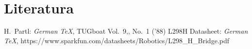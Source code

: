 \section{Literatura}

  \begin{thebibliography}{99}
     H.~Partl: \emph{German \TeX}, TUGboat Vol.~9,, No.~1 ('88)
     L298H Datasheet: \emph{German \TeX}, https://www.sparkfun.com/datasheets/Robotics/L298_H_Bridge.pdf
  \end{thebibliography}